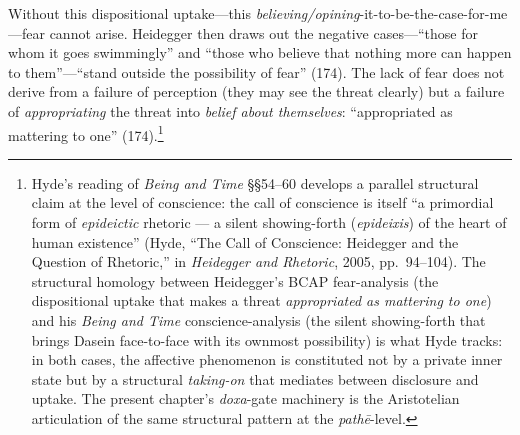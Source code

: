 \documentclass{article}
\begin{document}
Without this dispositional uptake---this \textit{believing/opining}-it-to-be-the-case-for-me---fear cannot arise. Heidegger then draws out the negative cases---``those for whom it goes swimmingly'' and ``those who believe that nothing more can happen to them''---``stand outside the possibility of fear'' (174). The lack of fear does not derive from a failure of perception (they may see the threat clearly) but a failure of \textit{appropriating} the threat into \textit{belief about themselves}: ``appropriated as mattering to one'' (174).\footnote{Hyde's reading of \textit{Being and Time} \S\S 54--60 develops a parallel structural claim at the level of conscience: the call of conscience is itself ``a primordial form of \textit{epideictic} rhetoric --- a silent showing-forth (\textit{epideixis}) of the heart of human existence'' (Hyde, ``The Call of Conscience: Heidegger and the Question of Rhetoric,'' in \textit{Heidegger and Rhetoric}, 2005, pp.~94--104). The structural homology between Heidegger's BCAP fear-analysis (the dispositional uptake that makes a threat \textit{appropriated as mattering to one}) and his \textit{Being and Time} conscience-analysis (the silent showing-forth that brings Dasein face-to-face with its ownmost possibility) is what Hyde tracks: in both cases, the affective phenomenon is constituted not by a private inner state but by a structural \textit{taking-on} that mediates between disclosure and uptake. The present chapter's \textit{doxa}-gate machinery is the Aristotelian articulation of the same structural pattern at the \textit{pathē}-level.}
\end{document}
